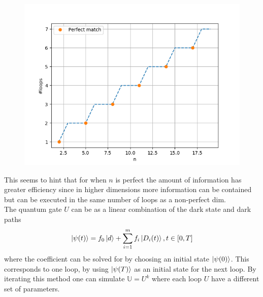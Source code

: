 \begin{figure}[H]
\centering
\includegraphics[scale=0.6]{figures/perfect_dim.png}
\end{figure}

This seems to hint that for when $n$ is perfect the amount of information has greater efficiency since in higher dimensions more information can be contained but can be executed in the same number of loops as a non-perfect dim. 
\\ 
The quantum gate $U$ can be as a linear combination of the dark state and dark paths
\begin{equation}
\ket{\psi(t)} = f_0\ket{d} + \sum_{i = 1}^{m}f_i\ket{D_i(t)}, t \in [0,T]
\end{equation}
where the coefficient can be solved for by choosing an initial state $\ket{\psi(0)}$. This corresponds to one loop, by using $\ket{\psi(T)}$ as an initial state for the next loop. By iterating this method one can simulate $\mathbb{U} = U^k$ where each loop $U$ have a different set of parameters.





